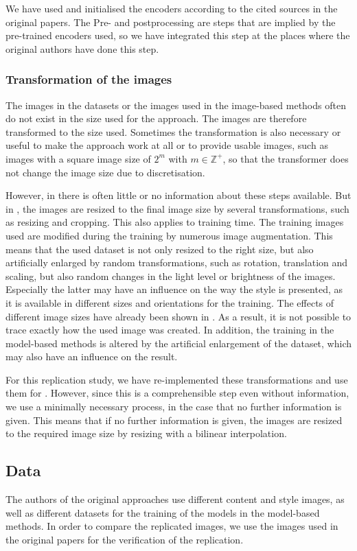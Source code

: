 We have used and initialised the encoders according to the cited sources in the original papers. The Pre- and postprocessing are steps that are implied by the pre-trained encoders used, so we have integrated this step at the places where the original authors have done this step.

\subsubsection{Transformation of the images}
The images in the datasets or the images used in the image-based methods often do not exist in the size used for the approach. The images are therefore transformed to the size used. Sometimes the transformation is also necessary or useful to make the approach work at all or to provide usable images, such as images with a square image size of $2^{m}$ with $ m \in \mathbb{Z}^{+}$, so that the transformer does not change the image size due to discretisation. 

However, in \paper{} there is often little or no information about these steps available. But in \implementation{}, the images are resized to the final image size by several transformations, such as resizing and cropping. This also applies to training time. The training images used are modified during the training by numerous image augmentation. This means that the used dataset is not only resized to the right size, but also artificially enlarged by random transformations, such as rotation, translation and scaling, but also random changes in the light level or brightness of the images. Especially the latter may have an influence on the way the style is presented, as it is available in different sizes and orientations for the training. The effects of different image sizes have already been shown in . As a result, it is not possible to trace exactly how the used image was created. In addition, the training in the model-based methods is altered by the artificial enlargement of the dataset, which may also have an influence on the result.

For this replication study, we have re-implemented these transformations and use them for \implementation{}. However, since this is a comprehensible step even without information, we use a minimally necessary process, in the case that no further information is given. This means that if no further information is given, the images are resized to the required image size by resizing with a bilinear interpolation.

\subsection{Data} \label{sec:data}
The authors of the original approaches use different content and style images, as well as different datasets for the training of the models in the model-based methods. In order to compare the replicated images, we use the images used in the original papers for the verification of the replication. 

